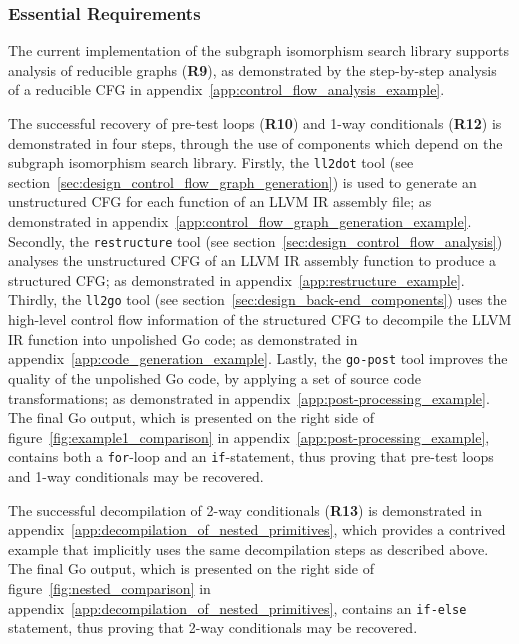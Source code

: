 
\subsubsection{Essential Requirements}
\label{sec:eval_control_flow_analysis_library_essential_requirements}


The current implementation of the subgraph isomorphism search library supports analysis of reducible graphs (\textbf{R9}), as demonstrated by the step-by-step analysis of a reducible CFG in appendix~\ref{app:control_flow_analysis_example}.


The successful recovery of pre-test loops (\textbf{R10}) and 1-way conditionals (\textbf{R12}) is demonstrated in four steps, through the use of components which depend on the subgraph isomorphism search library. Firstly, the \texttt{ll2dot} tool (see section~\ref{sec:design_control_flow_graph_generation}) is used to generate an unstructured CFG for each function of an LLVM IR assembly file; as demonstrated in appendix~\ref{app:control_flow_graph_generation_example}. Secondly, the \texttt{restructure} tool (see section~\ref{sec:design_control_flow_analysis}) analyses the unstructured CFG of an LLVM IR assembly function to produce a structured CFG; as demonstrated in appendix~\ref{app:restructure_example}. Thirdly, the \texttt{ll2go} tool (see section~\ref{sec:design_back-end_components}) uses the high-level control flow information of the structured CFG to decompile the LLVM IR function into unpolished Go code; as demonstrated in appendix~\ref{app:code_generation_example}. Lastly, the \texttt{go-post} tool improves the quality of the unpolished Go code, by applying a set of source code transformations; as demonstrated in appendix~\ref{app:post-processing_example}. The final Go output, which is presented on the right side of figure~\ref{fig:example1_comparison} in appendix~\ref{app:post-processing_example}, contains both a \texttt{for}-loop and an \texttt{if}-statement, thus proving that pre-test loops and 1-way conditionals may be recovered.


The successful decompilation of 2-way conditionals (\textbf{R13}) is demonstrated in appendix~\ref{app:decompilation_of_nested_primitives}, which provides a contrived example that implicitly uses the same decompilation steps as described above. The final Go output, which is presented on the right side of figure~\ref{fig:nested_comparison} in appendix~\ref{app:decompilation_of_nested_primitives}, contains an \texttt{if-else} statement, thus proving that 2-way conditionals may be recovered.

